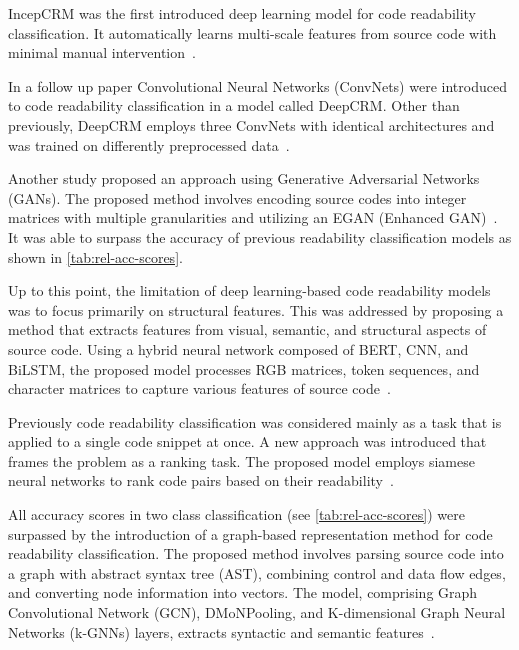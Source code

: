 \documentclass[%
class=scrreprt,
chapterprefix=false,%
open=right,%
twoside=false,%
paper=a4,%
logofile={Logo\_zentral\_farbig\_EN.png},%
thesistype=master,%
UKenglish,%
]{se2thesis}
\theoremstyle{definition}
\begin{document}
	IncepCRM was the first introduced deep learning model for code readability classification. It automatically learns multi-scale features from source code with minimal manual intervention~\cite{mi2018inception}.
	
	In a follow up paper Convolutional Neural Networks (ConvNets) were introduced to code readability classification in a model called DeepCRM. Other than previously, DeepCRM employs three ConvNets with identical architectures and was trained on differently preprocessed data~\cite{mi2018improving}.
		
	Another study proposed an approach using Generative Adversarial Networks (GANs). The proposed method involves encoding source codes into integer matrices with multiple granularities and utilizing an EGAN (Enhanced GAN)~\cite{sharma2020egan}. It was able to surpass the accuracy of previous readability classification models as shown in \autoref{tab:rel-acc-scores}.
	
	Up to this point, the limitation of deep learning-based code readability models was to focus primarily on structural features. This was addressed by proposing a method that extracts features from visual, semantic, and structural aspects of source code. Using a hybrid neural network composed of BERT, CNN, and BiLSTM, the proposed model processes RGB matrices, token sequences, and character matrices to capture various features of source code~\cite{mi2022towards}.
	
	Previously code readability classification was considered mainly as a task that is applied to a single code snippet at once. A new approach was introduced that frames the problem as a ranking task. The proposed model employs siamese neural networks to rank code pairs based on their readability~\cite{mi2022rank}.

	All accuracy scores in two class classification (see \autoref{tab:rel-acc-scores}) were surpassed by the introduction of a graph-based representation method for code readability classification. The proposed method involves parsing source code into a graph with abstract syntax tree (AST), combining control and data flow edges, and converting node information into vectors. The model, comprising Graph Convolutional Network (GCN), DMoNPooling, and K-dimensional Graph Neural Networks (k-GNNs) layers, extracts syntactic and semantic features~\cite{mi2023graph}.
	
\end{document}
